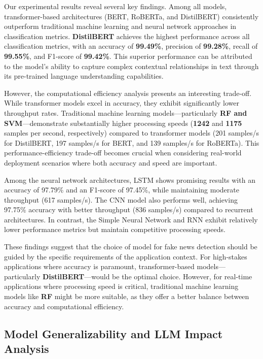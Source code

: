 \documentclass[runningheads]{llncs}
\begin{document}
Our experimental results reveal several key findings. Among all models, transformer-based architectures (BERT, RoBERTa, and DistilBERT) consistently outperform traditional machine learning and neural network approaches in classification metrics. \textbf{DistilBERT} achieves the highest performance across all classification metrics, with an accuracy of \textbf{99.49\%}, precision of \textbf{99.28\%}, recall of \textbf{99.55\%}, and F1-score of \textbf{99.42\%}. This superior performance can be attributed to the model's ability to capture complex contextual relationships in text through its pre-trained language understanding capabilities.

However, the computational efficiency analysis presents an interesting trade-off. While transformer models excel in accuracy, they exhibit significantly lower throughput rates. Traditional machine learning models—particularly \textbf{RF and SVM}—demonstrate substantially higher processing speeds (\textbf{1242} and \textbf{1175} samples per second, respectively) compared to transformer models (201 samples/s for DistilBERT, 197 samples/s for BERT, and 139 samples/s for RoBERTa). This performance-efficiency trade-off becomes crucial when considering real-world deployment scenarios where both accuracy and speed are important.

Among the neural network architectures, LSTM shows promising results with an accuracy of 97.79\% and an F1-score of 97.45\%, while maintaining moderate throughput (617 samples/s). The CNN model also performs well, achieving 97.75\% accuracy with better throughput (836 samples/s) compared to recurrent architectures. In contrast, the Simple Neural Network and RNN exhibit relatively lower performance metrics but maintain competitive processing speeds.

These findings suggest that the choice of model for fake news detection should be guided by the specific requirements of the application context. For high-stakes applications where accuracy is paramount, transformer-based models—particularly \textbf{DistilBERT}—would be the optimal choice. However, for real-time applications where processing speed is critical, traditional machine learning models like \textbf{RF} might be more suitable, as they offer a better balance between accuracy and computational efficiency.

\subsection{Model Generalizability and LLM Impact Analysis}
\label{subsec:llm_impact}
\end{document}
